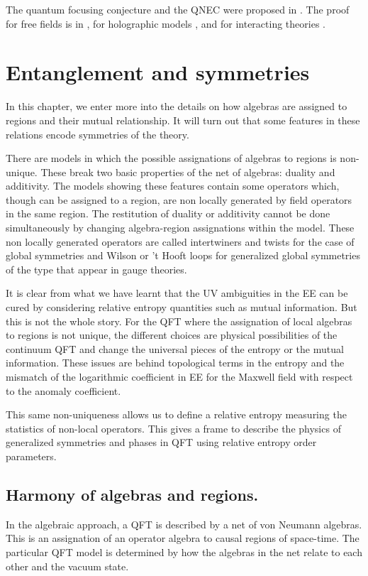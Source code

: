 \documentclass[12pt]{article}
\numberwithin{equation}{section}
\begin{document}
The quantum focusing conjecture and the QNEC were proposed in \cite{Bousso:2015mna}. The proof for free fields is in \cite{Bousso:2015wca}, for holographic models  \cite{Koeller:2015qmn,Leichenauer:2018obf}, and for interacting theories \cite{Balakrishnan:2017bjg,Balakrishnan:2019gxl}. 
 
\newpage

\section{Entanglement and symmetries}
In this chapter, we enter more into the details on how algebras are assigned to regions and their mutual relationship. It will turn out that some features in these relations encode symmetries of the theory.  

There are models in which the possible assignations of algebras to regions is non-unique. These break two basic properties of the net of algebras: duality and additivity. The models showing these features contain some operators which, though can be assigned to a region, are non locally generated by field operators in the same region.  The restitution of duality or additivity cannot be done simultaneously by changing algebra-region assignations within the model. These non locally generated operators are called intertwiners and twists for the case of global symmetries and Wilson or 't Hooft loops for generalized global symmetries of the type that appear in gauge theories.

It is clear from what we have learnt that the UV ambiguities in the EE can be cured by considering relative entropy quantities such as mutual information. But this is not the whole story. For the QFT where the assignation of local algebras to regions is not unique, the different choices are physical possibilities of the continuum QFT and change the universal pieces of the entropy or the mutual information. These issues are behind topological terms in the entropy and the mismatch of the logarithmic coefficient in EE for the Maxwell field with respect to the anomaly coefficient. 

This same non-uniqueness allows us to define a relative entropy measuring the statistics of non-local operators. This gives a frame to describe the physics of generalized symmetries and phases in QFT using relative entropy order parameters. 
 

\subsection{Harmony of algebras and regions. }
In the algebraic approach, a QFT is described by a net of von Neumann algebras. This is an assignation of an operator algebra to causal regions of space-time. The particular QFT model is determined by how the algebras in the net relate to each other and the vacuum state.
\end{document}

